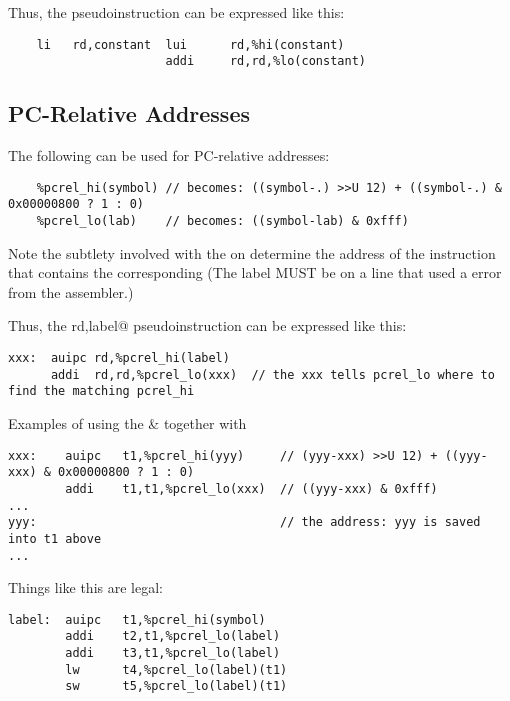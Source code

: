 Thus, the \verb@li@ pseudoinstruction can be expressed like this:

{\small
\begin{verbatim}
    li   rd,constant  lui      rd,%hi(constant)
                      addi     rd,rd,%lo(constant)
\end{verbatim}
}



\subsection{PC-Relative Addresses}

The following can be used for PC-relative addresses:
{\small
\begin{verbatim}
    %pcrel_hi(symbol) // becomes: ((symbol-.) >>U 12) + ((symbol-.) & 0x00000800 ? 1 : 0)
    %pcrel_lo(lab)    // becomes: ((symbol-lab) & 0xfff)
\end{verbatim}
}

Note the subtlety involved with the \verb@lab@ on \verb@%pcrel_lo@. It is needed to 
determine the address of the instruction that contains the corresponding \verb@%pcrel_hi@.
(The label \verb@lab@ MUST be on a line that used a \verb@%pcrel_hi()@ or get an 
error from the assembler.)

Thus, the \verb@la rd,label@ pseudoinstruction can be expressed like this:
{\small
\begin{verbatim}
xxx:  auipc rd,%pcrel_hi(label)
      addi  rd,rd,%pcrel_lo(xxx)  // the xxx tells pcrel_lo where to find the matching pcrel_hi
\end{verbatim}
}

Examples of using the \verb@auipc@ \& \verb@addi@ together with \verb@%pcrel_hi()@ and
\verb@%pcrel_lo()@:

{\small
\begin{verbatim}
xxx:    auipc   t1,%pcrel_hi(yyy)     // (yyy-xxx) >>U 12) + ((yyy-xxx) & 0x00000800 ? 1 : 0)
        addi    t1,t1,%pcrel_lo(xxx)  // ((yyy-xxx) & 0xfff)
...
yyy:                                  // the address: yyy is saved into t1 above
...
\end{verbatim}
}


Things like this are legal:
{\small
\begin{verbatim}
label:  auipc   t1,%pcrel_hi(symbol)     
        addi    t2,t1,%pcrel_lo(label)
        addi    t3,t1,%pcrel_lo(label)
        lw      t4,%pcrel_lo(label)(t1)
        sw      t5,%pcrel_lo(label)(t1)
\end{verbatim}
}

